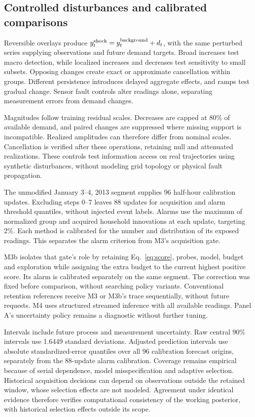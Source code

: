 \documentclass[conference]{IEEEtran}
\begin{document}
\subsection{Controlled disturbances and calibrated comparisons}
Reversible overlays produce $y^{\rm shock}_t=y^{\rm background}_t+d_t$, with the same perturbed series supplying observations and future demand targets. Broad increases test macro detection, while localized increases and decreases test sensitivity to small subsets. Opposing changes create exact or approximate cancellation within groups. Different persistence introduces delayed aggregate effects, and ramps test gradual change. Sensor fault controls alter readings alone, separating measurement errors from demand changes.

Magnitudes follow training residual scales. Decreases are capped at 80\% of available demand, and paired changes are suppressed where missing support is incompatible. Realized amplitudes can therefore differ from nominal scales. Cancellation is verified after these operations, retaining null and attenuated realizations. These controls test information access on real trajectories using synthetic disturbances, without modeling grid topology or physical fault propagation.

The unmodified January 3--4, 2013 segment supplies 96 half-hour calibration updates. Excluding steps 0--7 leaves 88 updates for acquisition and alarm threshold quantiles, without injected event labels. Alarms use the maximum of normalized group and acquired household innovations at each update, targeting 2\%. Each method is calibrated for the number and distribution of its exposed readings. This separates the alarm criterion from M3's acquisition gate.

M3b isolates that gate's role by retaining Eq.~\eqref{eq:score}, probes, model, budget and exploration while assigning the extra budget to the current highest positive score. Its alarm is calibrated separately on the same segment. The correction was fixed before comparison, without searching policy variants. Conventional retention references receive M3 or M3b's trace sequentially, without future requests. M4 uses structured streamed inference with all available readings. Panel A's uncertainty policy remains a diagnostic without further tuning.

Intervals include future process and measurement uncertainty. Raw central 90\% intervals use 1.6449 standard deviations. Adjusted prediction intervals use absolute standardized-error quantiles over all 96 calibration forecast origins, separately from the 88-update alarm calibration. Coverage remains empirical because of serial dependence, model misspecification and adaptive selection. Historical acquisition decisions can depend on observations outside the retained window, whose selection effects are not modeled. Agreement under identical evidence therefore verifies computational consistency of the working posterior, with historical selection effects outside its scope.
\end{document}
